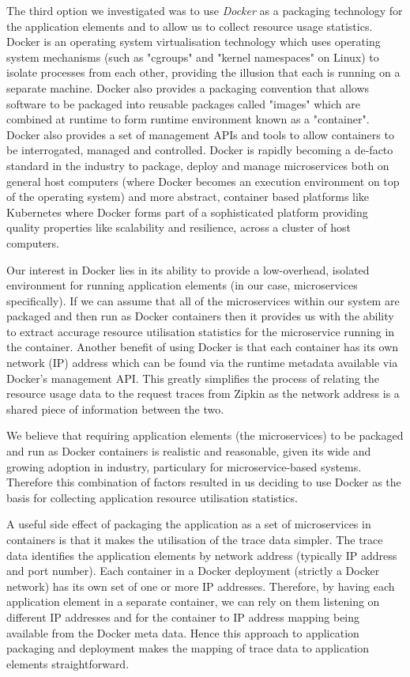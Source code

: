 The third option we investigated was to use \emph{Docker} \cite{docker2018} as a packaging technology for the application elements and to allow us to collect resource usage statistics.  Docker is an operating system virtualisation technology which uses operating system mechanisms (such as "cgroups" and "kernel namespaces" on Linux) to isolate processes from each other, providing the illusion that each is running on a separate machine.  Docker also provides a packaging convention that allows software to be packaged into reusable packages called "images" which are combined at runtime to form runtime environment known as a "container".  Docker also provides a set of management APIs and tools to allow containers to be interrogated, managed and controlled.  Docker is rapidly becoming a de-facto standard in the industry to package, deploy and manage microservices both on general host computers (where Docker becomes an execution environment on top of the operating system) and more abstract, container based platforms like Kubernetes \cite{kubernetes2018} where Docker forms part of a sophisticated platform providing quality properties like scalability and resilience, across a cluster of host computers.

Our interest in Docker lies in its ability to provide a low-overhead, isolated environment for running application elements (in our case, microservices specifically).  If we can assume that all of the microservices within our system are packaged and then run as Docker containers then it provides us with the ability to extract accurage resource utilisation statistics for the microservice running in the container.  Another benefit of using Docker is that each container has its own network (IP) address which can be found via the runtime metadata available via Docker's management API.  This greatly simplifies the process of relating the resource usage data to the request traces from Zipkin as the network address is a shared piece of information between the two.

We believe that requiring application elements (the microservices) to be packaged and run as Docker containers is realistic and reasonable, given its wide and growing adoption in industry, particulary for microservice-based systems.  Therefore this combination of factors resulted in us deciding to use Docker as the basis for collecting application resource utilisation statistics.

A useful side effect of packaging the application as a set of microservices in containers is that it makes the utilisation of the trace data simpler.  The trace data identifies the application elements by network address (typically IP address and port number).  Each container in a Docker deployment (strictly a Docker network) has its own set of one or more IP addresses.  Therefore, by having each application element in a separate container, we can rely on them listening on different IP addresses and for the container to IP address mapping being available from the Docker meta data.  Hence this approach to application packaging and deployment makes the mapping of trace data to application elements straightforward. 

